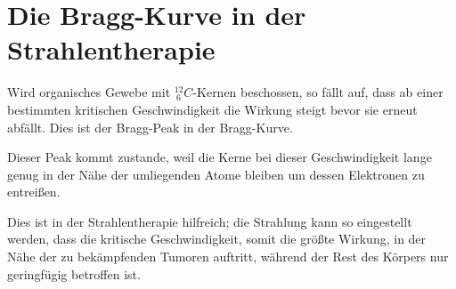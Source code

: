 \documentclass{article}
\begin{document}
\section{Die Bragg-Kurve in der Strahlentherapie} 
Wird organisches Gewebe mit $^{12}_{\ 6}C$-Kernen beschossen, so fällt auf, dass ab einer bestimmten kritischen Geschwindigkeit die Wirkung steigt bevor sie erneut abfällt. Dies ist der Bragg-Peak in der Bragg-Kurve.
\begin{center} 
\end{center}
Dieser Peak kommt zustande, weil die Kerne bei dieser Geschwindigkeit lange genug in der Nähe der umliegenden Atome bleiben um dessen Elektronen zu entreißen. 
 
Dies ist in der Strahlentherapie hilfreich; die Strahlung kann so eingestellt werden, dass die kritische Geschwindigkeit, somit die größte Wirkung, in der Nähe der zu bekämpfenden Tumoren auftritt, während der Rest des Körpers nur geringfügig betroffen ist.
 
\end{document}
